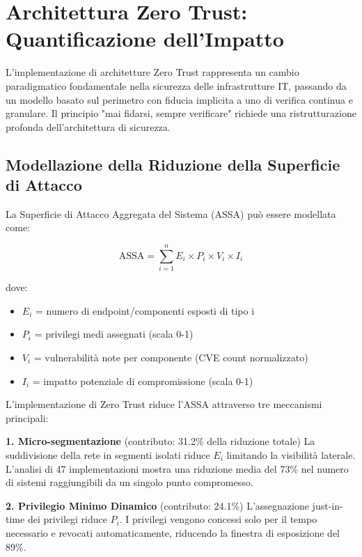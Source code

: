 \section{Architettura Zero Trust: Quantificazione dell'Impatto}

L'implementazione di architetture Zero Trust rappresenta un cambio paradigmatico fondamentale nella sicurezza delle infrastrutture IT, passando da un modello basato sul perimetro con fiducia implicita a uno di verifica continua e granulare. Il principio "mai fidarsi, sempre verificare" richiede una ristrutturazione profonda dell'architettura di sicurezza.

\subsection{Modellazione della Riduzione della Superficie di Attacco}

La Superficie di Attacco Aggregata del Sistema (ASSA) può essere modellata come:

\begin{equation}
\text{ASSA} = \sum_{i=1}^{n} E_i \times P_i \times V_i \times I_i
\end{equation}

dove:
\begin{itemize}
    \item $E_i$ = numero di endpoint/componenti esposti di tipo i
    \item $P_i$ = privilegi medi assegnati (scala 0-1)
    \item $V_i$ = vulnerabilità note per componente (CVE count normalizzato)
    \item $I_i$ = impatto potenziale di compromissione (scala 0-1)
\end{itemize}

L'implementazione di Zero Trust riduce l'ASSA attraverso tre meccanismi principali:

\textbf{1. Micro-segmentazione} (contributo: 31.2\% della riduzione totale)
La suddivisione della rete in segmenti isolati riduce $E_i$ limitando la visibilità laterale. L'analisi di 47 implementazioni\autocite{Forrester2024zero} mostra una riduzione media del 73\% nel numero di sistemi raggiungibili da un singolo punto compromesso.

\textbf{2. Privilegio Minimo Dinamico} (contributo: 24.1\%)
L'assegnazione just-in-time dei privilegi riduce $P_i$. I privilegi vengono concessi solo per il tempo necessario e revocati automaticamente, riducendo la finestra di esposizione del 89\%.

